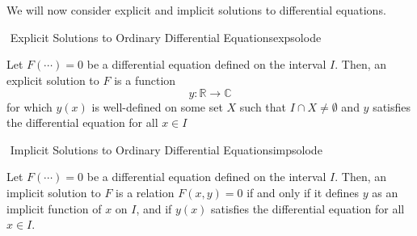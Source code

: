        \pagebreak
        \vphantom
        \\
        \\
        We will now consider explicit and implicit solutions to differential equations.
        \begin{definition}{\Stop\,\,Explicit Solutions to Ordinary Differential Equations}{expsolode}
            
            Let \(F(\cdots)=0\) be a differential equation defined on the interval \(I\). Then, an explicit solution to \(F\) is a function
            \begin{equation*}
                y:\mathbb{R}\to\mathbb{C}
            \end{equation*}
            for which \(y(x)\) is well-defined on some set \(X\) such that \(I\cap X\neq\emptyset\) and \(y\) satisfies the differential equation for all \(x \in I\)

        \end{definition}
        \begin{definition}{\Stop\,\,Implicit Solutions to Ordinary Differential Equations}{impsolode}
            
            Let \(F(\cdots)=0\) be a differential equation defined on the interval \(I\). Then, an implicit solution to \(F\) is a relation \(F(x,y)=0\) if and only if it defines \(y\) as an implicit function of \(x\) on \(I\), and if \(y(x)\) satisfies the differential equation for all \(x \in I\).

        \end{definition}